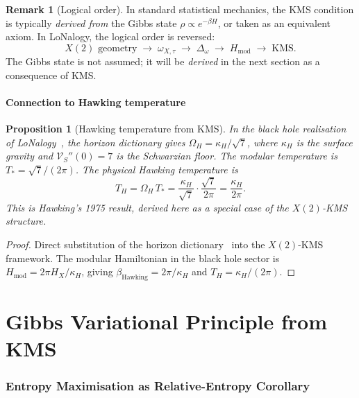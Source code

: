 \documentclass[12pt]{article}
\theoremstyle{plain}
\newtheorem{proposition}[theorem]{Proposition}
\theoremstyle{definition}
\newtheorem{remark}[theorem]{Remark}
\numberwithin{equation}{section}
\begin{document}
\begin{remark}[Logical order]
In standard statistical mechanics, the KMS condition is typically
\emph{derived from} the Gibbs state $\rho\propto e^{-\beta H}$, or
taken as an equivalent axiom.  In LoNalogy, the logical order is
reversed:
\begin{equation}
X(2)\text{ geometry}\;\to\;\omega_{X,\tau}\;\to\;\Delta_\omega
\;\to\; H_{\mathrm{mod}}\;\to\;\text{KMS}.
\end{equation}
The Gibbs state is not assumed; it will be \emph{derived} in the next
section as a consequence of KMS.
\end{remark}

\subsection{Connection to Hawking temperature}

\begin{proposition}[Hawking temperature from KMS]\label{prop:hawking}
In the black hole realisation of LoNalogy~\cite{ParticleCosmo}, the
horizon dictionary gives
$\Omega_H=\kappa_H/\sqrt{7}$, where $\kappa_H$ is the surface gravity
and $\mathcal{V}_S''(0)=7$ is the Schwarzian floor.  The modular
temperature is $T_*=\sqrt{7}/(2\pi)$.  The physical Hawking temperature
is
\begin{equation}
T_H = \Omega_H\,T_* = \frac{\kappa_H}{\sqrt{7}}\cdot\frac{\sqrt{7}}{2\pi}
= \frac{\kappa_H}{2\pi}.
\end{equation}
This is Hawking's 1975 result, derived here as a special case of the
$X(2)$-KMS structure.
\end{proposition}

\begin{proof}
Direct substitution of the horizon dictionary~\cite{ParticleCosmo}
into the $X(2)$-KMS framework.  The modular Hamiltonian in the
black hole sector is $H_{\mathrm{mod}}=2\pi H_X/\kappa_H$, giving
$\beta_{\mathrm{Hawking}}=2\pi/\kappa_H$ and
$T_H=\kappa_H/(2\pi)$.
\end{proof}


\part{Gibbs Variational Principle from KMS}

\section{Entropy Maximisation as Relative-Entropy Corollary}\label{sec:gibbs}
\end{document}
